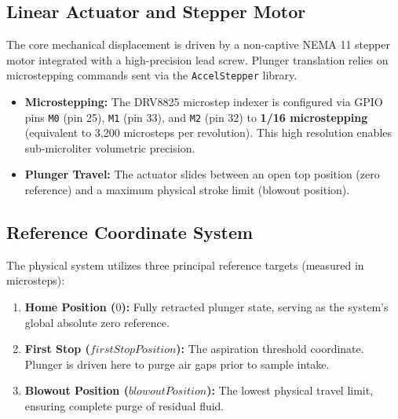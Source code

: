 \documentclass[11pt,a4paper]{article}
\begin{document}
\subsection{Linear Actuator and Stepper Motor}
The core mechanical displacement is driven by a non-captive NEMA 11 stepper motor integrated with a high-precision lead screw. Plunger translation relies on microstepping commands sent via the \texttt{AccelStepper} library.
\begin{itemize}
    \item \textbf{Microstepping:} The DRV8825 microstep indexer is configured via GPIO pins \texttt{M0} (pin 25), \texttt{M1} (pin 33), and \texttt{M2} (pin 32) to \textbf{1/16 microstepping} (equivalent to 3,200 microsteps per revolution). This high resolution enables sub-microliter volumetric precision.
    \item \textbf{Plunger Travel:} The actuator slides between an open top position (zero reference) and a maximum physical stroke limit (blowout position).
\end{itemize}

\subsection{Reference Coordinate System}
The physical system utilizes three principal reference targets (measured in microsteps):
\begin{enumerate}
    \item \textbf{Home Position ($0$):} Fully retracted plunger state, serving as the system's global absolute zero reference.
    \item \textbf{First Stop ($firstStopPosition$):} The aspiration threshold coordinate. Plunger is driven here to purge air gaps prior to sample intake.
    \item \textbf{Blowout Position ($blowoutPosition$):} The lowest physical travel limit, ensuring complete purge of residual fluid.
\end{enumerate}
\end{document}
